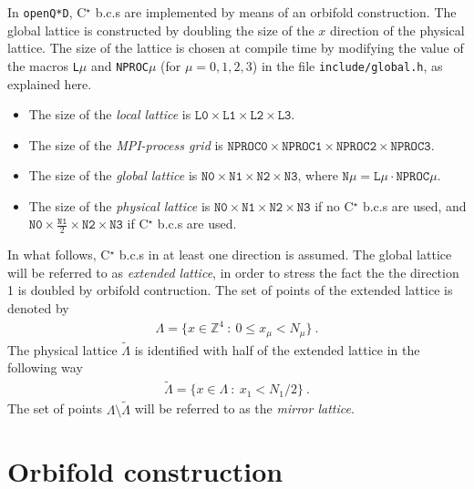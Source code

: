 \documentclass[11pt,fleqn]{article}
\begin{document}
In \texttt{openQ*D}, C$^\star$ b.c.s are implemented by means of an orbifold construction. The global lattice is constructed by doubling the size of the $x$ direction of the physical lattice. The size of the lattice is chosen at compile time by modifying the value of the macros \texttt{L}$\mu$ and \texttt{NPROC}$\mu$ (for $\mu=0,1,2,3$) in the file \texttt{include/global.h}, as explained here.
\begin{itemize}
   \item The size of the \textit{local lattice} is $\texttt{L0} \times \texttt{L1} \times \texttt{L2} \times \texttt{L3}$.
   \item The size of the \textit{MPI-process grid} is $\texttt{NPROC0} \times \texttt{NPROC1} \times \texttt{NPROC2} \times \texttt{NPROC3}$.
   \item The size of the \textit{global lattice} is $\texttt{N0} \times \texttt{N1} \times \texttt{N2} \times \texttt{N3}$, where $\texttt{N}\mu = \texttt{L}\mu \cdot \texttt{NPROC}\mu$.
   \item The size of the \textit{physical lattice} is $\texttt{N0} \times \texttt{N1} \times \texttt{N2} \times \texttt{N3}$ if no C$^\star$ b.c.s are used, and $\texttt{N0} \times \frac{\texttt{N1}}{2} \times \texttt{N2} \times \texttt{N3}$ if C$^\star$ b.c.s are used.
\end{itemize}

In what follows, C$^\star$ b.c.s in at least one direction is assumed. The global lattice will be referred to as \textit{extended lattice}, in order to stress the fact the the direction 1 is doubled by orbifold contruction. The set of points of the extended lattice is denoted by
\begin{gather}
   \Lambda = \{ x \in \mathbb{Z}^4 \ : \ 0 \le x_\mu < N_\mu \} \ .
\end{gather}
The physical lattice $\tilde{\Lambda}$ is identified with half of the extended lattice in the following way
\begin{gather}
   \tilde{\Lambda} = \{ x \in \Lambda \ : \ x_1 < N_1/2 \} \ .
\end{gather}
The set of points $\Lambda \setminus \tilde{\Lambda}$ will be referred to as the \textit{mirror lattice}.





\section{Orbifold construction}
\end{document}
